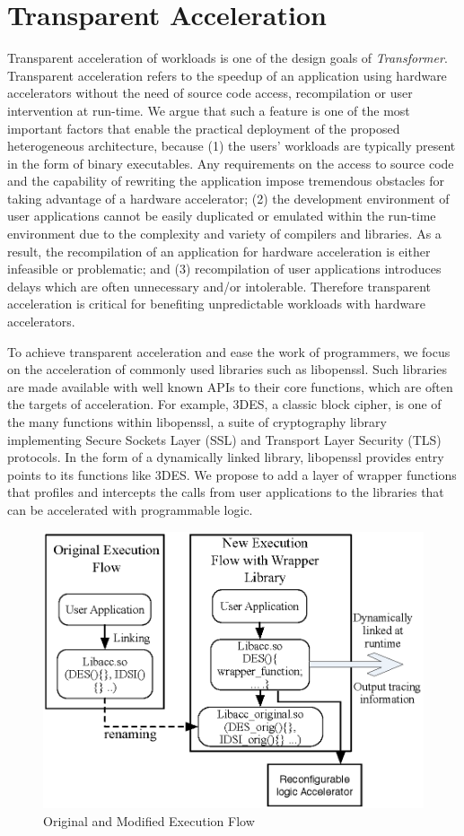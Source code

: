 \section{Transparent Acceleration}
\label{sec_transacc}


Transparent acceleration of workloads is one of the design goals of
{\em Transformer}. Transparent acceleration refers to the speedup of
an application using hardware accelerators without the need of source
code access, recompilation or user intervention at run-time. We argue that such a feature is one of
the most important factors that enable the practical deployment of the
proposed heterogeneous architecture, because (1) the users'
workloads are typically present in the form of binary executables. Any
requirements on the access to source code and the capability of
rewriting the application impose tremendous obstacles for taking
advantage of a hardware accelerator; (2) the development environment
of user applications cannot be easily duplicated or emulated within
the run-time environment due to the complexity and variety of
compilers and libraries. As a result, the recompilation of an
application for hardware acceleration is either infeasible or
problematic; and (3) recompilation of user applications introduces
delays which are often unnecessary and/or intolerable. Therefore
transparent acceleration is critical for benefiting unpredictable
workloads with hardware accelerators.

To achieve transparent acceleration and ease the work of programmers,
we focus on the acceleration of commonly used libraries such as
libopenssl. Such libraries are made available with well known APIs to
their core functions, which are often the targets of acceleration. For
example, 3DES, a classic block cipher, is one of the many functions
within libopenssl, a suite of cryptography library implementing Secure
Sockets Layer (SSL) and Transport Layer Security
(TLS)\cite{wikissl} protocols. In the form of a dynamically linked
library, libopenssl provides entry points to its functions like
3DES. We propose to add a layer of wrapper functions that profiles and
intercepts the calls from user applications to the libraries that can
be accelerated with programmable logic. 


\begin{figure}
    \centering
    \includegraphics[width=4.0 in]{HPCA14-wrapperlib}
    \caption{Original and Modified Execution Flow}
    \label{fig_transacc_flow}
\end{figure}

